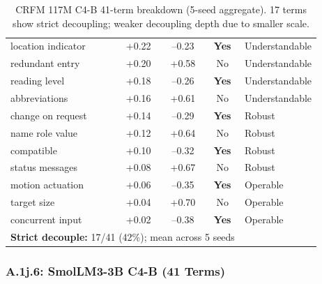 \documentclass[10pt]{article} %
\begin{document}
\begin{table}[H]
\begin{tabular}{|l|c|c|c|l|}
location indicator & +0.22 & --0.23 & \textbf{Yes} & Understandable \\
redundant entry & +0.20 & +0.58 & No & Understandable \\
reading level & +0.18 & --0.26 & \textbf{Yes} & Understandable \\
abbreviations & +0.16 & +0.61 & No & Understandable \\
change on request & +0.14 & --0.29 & \textbf{Yes} & Robust \\
name role value & +0.12 & +0.64 & No & Robust \\
compatible & +0.10 & --0.32 & \textbf{Yes} & Robust \\
status messages & +0.08 & +0.67 & No & Robust \\
motion actuation & +0.06 & --0.35 & \textbf{Yes} & Operable \\
target size & +0.04 & +0.70 & No & Operable \\
concurrent input & +0.02 & --0.38 & \textbf{Yes} & Operable \\
\hline
\multicolumn{4}{|l|}{\textbf{Strict decouple:} 17/41 (42\%); mean across 5 seeds} \\
\hline
\end{tabular}
\caption{CRFM 117M C4-B 41-term breakdown (5-seed aggregate). 17 terms show strict decoupling; weaker decoupling depth due to smaller scale.}
\end{table}

\subsubsection*{A.1j.6: SmolLM3-3B C4-B (41 Terms)}
\end{document}
